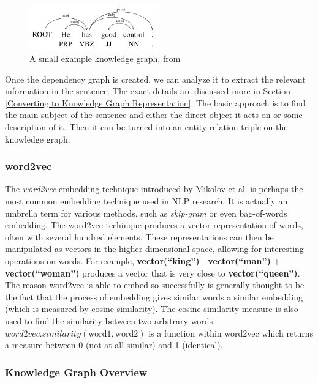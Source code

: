\documentclass[pageno]{final_paper}
\begin{document}
\begin{figure}[!tb]
    \centering
    \includegraphics[width=0.5\textwidth,keepaspectratio]{figures/Dependency_Graph.png}
    \caption{A small example knowledge graph, from \cite{Chen2014}}
    \label{fig: dependency parsing}
\end{figure}

Once the dependency graph is created, we can analyze it to extract the relevant
information in the sentence. The exact details are discussed more in Section
\ref{Converting to Knowledge Graph Representation}. The basic approach is to
find the main subject of the sentence and either the direct object it acts on or
some description of it. Then it can be turned into an entity-relation triple on
the knowledge graph.

\subsubsection{word2vec}
\label{word2vec}

The \textit{word2vec} embedding technique introduced by Mikolov et al.
\cite{Mikolov2013} is perhaps the most common embedding technique used in NLP
research. It is actually an umbrella term for various methods, such as
\textit{skip-gram} or even bag-of-words embedding. The word2vec techinque
produces a vector representation of words, often with several hundred elements.
These representations can then be manipulated as vectors in the
higher-dimensional space, allowing for interesting operations on words. For
example, \textbf{vector(``king'')} - \textbf{vector(``man'')} +
\textbf{vector(``woman'')} produces a vector that is very close to
\textbf{vector(``queen'')}. The reason word2vec is able to embed so successfully
is generally thought to be the fact that the process of embedding gives similar
words a similar embedding (which is measured by cosine similarity). The cosine
similarity measure is also used to find the similarity between two arbitrary
words. $word2vec.similarity(\text{word1}, \text{word2})$ is a function within
word2vec which returns a measure between 0 (not at all similar) and 1
(identical).

\subsubsection{Knowledge Graph Overview}
\label{Knowledge Graph Overview}
\end{document}
